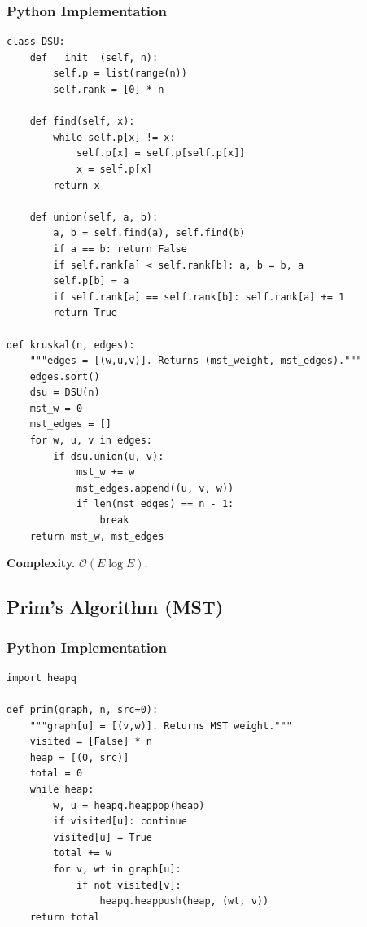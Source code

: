 \documentclass[10pt,a4paper]{article}
\theoremstyle{cpstyle}
\newcommand{\bigO}[1]{\mathcal{O}\!\left(#1\right)}
\begin{document}
\subsubsection{Python Implementation}
\begin{lstlisting}[caption={Kruskal's MST with DSU}]
class DSU:
    def __init__(self, n):
        self.p = list(range(n))
        self.rank = [0] * n

    def find(self, x):
        while self.p[x] != x:
            self.p[x] = self.p[self.p[x]]
            x = self.p[x]
        return x

    def union(self, a, b):
        a, b = self.find(a), self.find(b)
        if a == b: return False
        if self.rank[a] < self.rank[b]: a, b = b, a
        self.p[b] = a
        if self.rank[a] == self.rank[b]: self.rank[a] += 1
        return True

def kruskal(n, edges):
    """edges = [(w,u,v)]. Returns (mst_weight, mst_edges)."""
    edges.sort()
    dsu = DSU(n)
    mst_w = 0
    mst_edges = []
    for w, u, v in edges:
        if dsu.union(u, v):
            mst_w += w
            mst_edges.append((u, v, w))
            if len(mst_edges) == n - 1:
                break
    return mst_w, mst_edges
\end{lstlisting}

\textbf{Complexity.} $\bigO{E \log E}$.

\subsection{Prim's Algorithm (MST)}

\subsubsection{Python Implementation}
\begin{lstlisting}[caption={Prim's MST with priority queue}]
import heapq

def prim(graph, n, src=0):
    """graph[u] = [(v,w)]. Returns MST weight."""
    visited = [False] * n
    heap = [(0, src)]
    total = 0
    while heap:
        w, u = heapq.heappop(heap)
        if visited[u]: continue
        visited[u] = True
        total += w
        for v, wt in graph[u]:
            if not visited[v]:
                heapq.heappush(heap, (wt, v))
    return total
\end{lstlisting}
\end{document}
